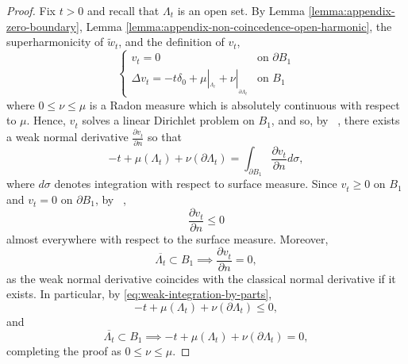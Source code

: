 \documentclass[12pt]{amsart}
\numberwithin{equation}{section}
\newcommand{\lssshift}[2]{\hyperref[eq:appendix-least-supersolution]{\tilde{w}^{#1}_{#2}}}
\newcommand{\cluster}[2]{\hyperref[eq:non-co-set]{\mathit{\Lambda}^{#1}_{#2}}}
\newcommand{\odometer}[2]{\hyperref[eq:limit-odometer]{v^{#1}_{#2}}}
\begin{document}
	\begin{proof}
		Fix $t > 0$ and recall that ${\cluster{}{t}}$ is an open set. By Lemma \ref{lemma:appendix-zero-boundary}, Lemma \ref{lemma:appendix-non-coincedence-open-harmonic},
		the superharmonicity of $\lssshift{}{t}$, and the definition of $\odometer{}{t}$, 
		\begin{equation} \label{eq:laplacian-of-v}
		\begin{cases}
		\odometer{}{t} = 0  &\mbox{on $\partial B_1$} \\
		\Delta \odometer{}{t} = -t \delta_0 + \mu |_{_{{{\cluster{}{t}}}}} + \nu |_{_{\partial {\cluster{}{t}}}} &\mbox{on $B_1$}
		\end{cases}
		\end{equation}
		where $0 \leq \nu \leq \mu$ is a Radon measure which is absolutely continuous with respect to $\mu$. Hence, 
		$\odometer{}{t}$ solves a linear Dirichlet problem on $B_1$, and so, by ~\cite[Proposition 7.3]{ponce2016elliptic},
		there exists a weak normal derivative $\frac{ \partial \odometer{}{t}}{\partial n}$ so that 
		\begin{equation} \label{eq:weak-integration-by-parts}
		-t + \mu({\cluster{}{t}}) + \nu(\partial {\cluster{}{t}}) = \int_{\partial B_1} \frac{ \partial \odometer{}{t}}{\partial n} d \sigma,
		\end{equation}
		where $d \sigma$ denotes integration with respect to surface measure. 
		Since $\odometer{}{t} \geq 0$ on $B_1$ and $\odometer{}{t} = 0$ on $\partial B_1$, by ~\cite[Lemma 12.15]{ponce2016elliptic},
		\begin{equation}
		\frac{ \partial \odometer{}{t}}{\partial n} \leq 0
		\end{equation}
		almost everywhere with respect to the surface measure. Moreover,
		\begin{equation}
		\overline{{{\cluster{}{t}}}} \subset B_1 \implies \frac{ \partial \odometer{}{t}}{\partial n} = 0, 
		\end{equation}
		as the weak normal derivative coincides with the classical normal derivative if it exists. 
		In particular, by \eqref{eq:weak-integration-by-parts}, 
		\begin{equation}
		-t + \mu({\cluster{}{t}}) + \nu(\partial {\cluster{}{t}}) \leq 0,
		\end{equation}
		and
		\begin{equation}
		\overline{{{\cluster{}{t}}}} \subset B_1 \implies -t + \mu({\cluster{}{t}}) + \nu(\partial {\cluster{}{t}}) = 0, 
		\end{equation}
		completing the proof as $0 \leq \nu \leq \mu$.
	\end{proof}
	
\end{document}
